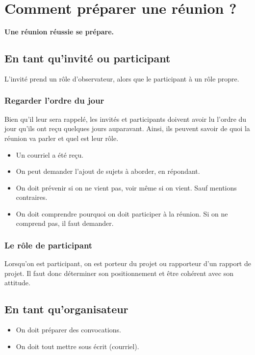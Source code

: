 \section{Comment préparer une réunion ?}
\textbf{Une réunion réussie se prépare.}

\subsection{En tant qu'invité ou participant}
L'invité prend un rôle d'observateur, alors que le participant à un rôle propre.

\subsubsection{Regarder l'ordre du jour}
Bien qu'il leur sera rappelé, les invités et participants doivent avoir lu l'ordre du jour qu'ils ont reçu quelques jours auparavant. Ainsi, ils peuvent savoir de quoi la réunion va parler et quel est leur rôle.

\begin{itemize}
    \item Un courriel a été reçu.
    \item On peut demander l'ajout de sujets à aborder, en répondant.
    \item On doit prévenir si on ne vient pas, voir même si on vient. Sauf mentions contraires.
    \item On doit comprendre pourquoi on doit participer à la réunion. Si on ne comprend pas, il faut demander.
\end{itemize}

\subsubsection{Le rôle de participant}
Lorsqu'on est participant, on est porteur du projet ou rapporteur d'un rapport de projet. Il faut donc déterminer son positionnement et être cohérent avec son attitude.

\subsection{En tant qu'organisateur}
\begin{itemize}
    \item On doit préparer des convocations.
    \item On doit tout mettre sous écrit (courriel).
\end{itemize}

